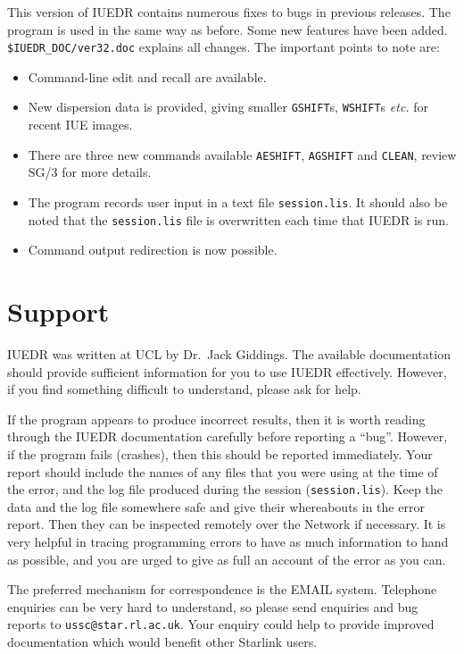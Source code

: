 This version of IUEDR contains numerous fixes to bugs in previous releases.
The program is used in the same way as before.
Some new features have been added.
\verb+$IUEDR_DOC/ver32.doc+ explains all changes.
The important points to note are:

\begin {itemize}

\item Command-line edit and recall are available.
\item New dispersion data is provided, giving smaller \verb+GSHIFT+s,
      \verb+WSHIFT+s {\it etc.}
      for recent IUE images.
\item There are three new commands available {\tt AESHIFT}, {\tt AGSHIFT} and
      {\tt CLEAN}, review SG/3 for more details.
\item The program records user input in a text file {\tt session.lis}.
      It should also be noted that the {\tt session.lis} file is overwritten
      each time that IUEDR is run.
\item Command output redirection is now possible.

\end {itemize}


\section {\label{se:support}Support}

IUEDR was written at UCL by Dr.~Jack Giddings. The available
documentation should provide sufficient information for you to use
IUEDR effectively. However, if you find something difficult to
understand,  please ask for help.

If the program appears to produce incorrect results, then it is worth
reading  through the IUEDR documentation carefully before reporting a
``bug''. However, if the program fails (crashes), then this should be
reported immediately. Your report should include the names of any
files that you were using at the time of the error, and the log file
produced during the session ({\tt session.lis}). Keep the  data and
the log file  somewhere safe and give their whereabouts in the error
report. Then they can be inspected remotely over the Network if
necessary. It is very helpful in tracing programming errors to have as
much information to hand as possible, and you are urged to give as
full an account of the error as you can.

The preferred mechanism for correspondence is the EMAIL system.
Telephone enquiries can be very hard to understand, so please send
enquiries and bug reports to {\tt ussc@star.rl.ac.uk}. Your enquiry
could help to provide improved documentation which would benefit other
Starlink users.


